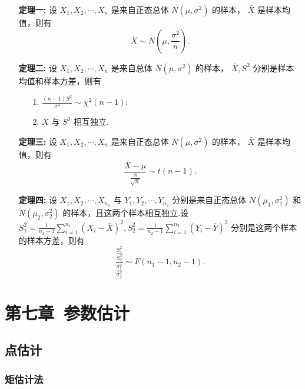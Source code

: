 \documentclass[UTF8,10pt]{ctexart}
\begin{document}
	\begin{itemize}
		\item [ \textbf{定理一:}] 设 $ X_{1},X_{2}, \cdots ,X_{n} $ 是来自正态总体 $ N( \mu, \sigma ^{2}) $ 的样本， $ \bar{X} $ 是样本均值，则有 $$ \bar{X} \sim N( \mu , \frac{ \sigma ^{2}}{n}). $$
		\item [ \textbf{定理二:}] 设 $ X_{1},X_{2}, \cdots ,X_{n} $ 是来自总体 $ N( \mu, \sigma ^{2}) $ 的样本， $ \bar{X} ,S^{2} $ 分别是样本均值和样本方差，则有 {
			\begin{enumerate}
				\item [1.] $ \frac{(n-1)S^{2}}{ \sigma ^{2} } \sim \chi ^{2}(n-1) ; $
				\item [2.] $ \bar{X} $ 与 $ S^{2} $ 相互独立.
			\end{enumerate}
		}
		\item [ \textbf{定理三:}] 设 $ X_{1},X_{2}, \cdots ,X_{n} $ 是来自正态总体 $ N( \mu, \sigma ^{2}) $ 的样本， $ \bar{X} $ 是样本均值，则有 $$ \frac{ \bar{X} - \mu }{ \frac{S}{ \sqrt{n} } } \sim t(n-1). $$
		\item [ \textbf{定理四:}] 设 $ X_{1},X_{2}, \cdots ,X_{n_{1}} $ 与 $ Y_{1},Y_{2}, \cdots ,Y_{n_{2}} $ 分别是来自正态总体 $ N( \mu _{1}, \sigma _{1}^{2} ) $ 和 $ N( \mu _{2}, \sigma _{2}^{2} ) $ 的样本，且这两个样本相互独立.设 $ S_{1}^{2}= \frac{1}{n_{1}-1} \sum\limits_{i=1}^{n_{1}} (X_{i}- \bar{X} )^{2}, S_{2}^{2}= \frac{1}{n_{2}-1} \sum\limits_{i=1}^{n_{2}} (Y_{i}- \bar{Y})^{2} $ 分别是这两个样本的样本方差，则有 $$ \frac{ \frac{S_{1}^{2}}{ S_{2}^{2 } }}{ \frac{\sigma_{1}^{2}}{ \sigma_{2}^{2}} } \sim F(n_{1}-1,n_{2}-1). $$
	\end{itemize}
		
	\section{第七章\ 参数估计}
	
	\subsection{点估计}
	
	\subsubsection{矩估计法}
	
\end{document}

